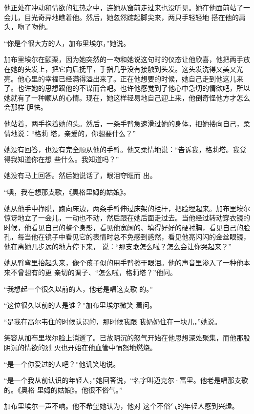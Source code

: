 \documentclass{article}
\begin{document}
他正处在冲动和情欲的狂热之中，连她从窗前走过来也没听见。她在他面前站了一会儿，目光奇异地瞧着他。然后，她忽然踮起脚尖来，两只手轻轻地
搭在他的肩头，吻了吻他。 

“你是个很大方的人，加布里埃尔，”她说。

\newpage

加布里埃尔在颤栗，因为她突然的一吻和她说这句时的仪态让他欣喜，他把两手放在她的头发上，把它向后抚平，手指几乎没有接触到头发。这头发洗得又美又光亮。他心里的幸福已经满得溢出来了。正在他想要的时候，她自己走到他这儿来了。也许她的思想跟他的不谋而合吧。也许他感觉到了他心中急切的情欲吧，所以她就有了一种顺从的心情。现在，她这样轻易地自己迎上来，他倒奇怪他方才怎么会那样
胆怯。 

他站着，两手抱着她的头。然后，一条手臂急速滑过她的身体，把她搂向自己，柔情地说：“格莉
塔，亲爱的，你想要什么？” 

她没有回答，也没有完全顺从他的手臂。他又柔情地说：“告诉我，格莉塔。我觉得我知道你在想
些什么。我知道吗？” 

她没有马上回答。然后她说话了，眼泪夺眶而
出。 

\newpage

“噢，我在想那支歌，《奥格里姆的姑娘》。

她从他手中挣脱，跑向床边，两条手臂伸过床架的栏杆，把脸埋起来。加布里埃尔惊讶地立了一会儿，一动也不动，然后跟在她后面走过去。当他经过转动穿衣镜的时候，他看见自己的整个身影，看见他宽阔的、填得好好的硬衬胸，看见自己的脸孔，每当他在镜子中看见它的表情时总不免感到惑然，看见他亮闪闪的金丝眼镜，他在离她几步远的地方停下来，
说：“那支歌怎么啦？怎么会让你哭起来？” 

她从臂弯里抬起头来，像个孩子似的用手臂擦干眼泪。他的声音里渗入了一种他本来不曾想有的更
亲切的调子、“怎么啦，格莉塔？”他问。 

“我想起一个很久以前的人，他老是唱这支歌
的。” 

“这位很久以前的人是谁？”加布里埃尔微笑
着问。 

\newpage

“是我在高尔韦住的时候认识的，那时候我跟
我奶奶住在一块儿，”她说。 

笑容从加布里埃尔脸上消逝了。已故阴沉的怒气开始在他思想深处聚集，而他那股阴沉的情欲的烈
火也开始在他血管中愤怒地燃烧。 


“是一个你爱过的人吧？”他讥笑地说。 

“是一个我从前认识的年轻人，”她回答说，“名字叫迈克尔·富里。他老是唱那支歌的。《奥格
里姆的姑娘》。他很不俗气。” 

加布里埃尔一声不响。他不希望她认为，他对
这个不俗气的年轻人感到兴趣。 
\end{document}
